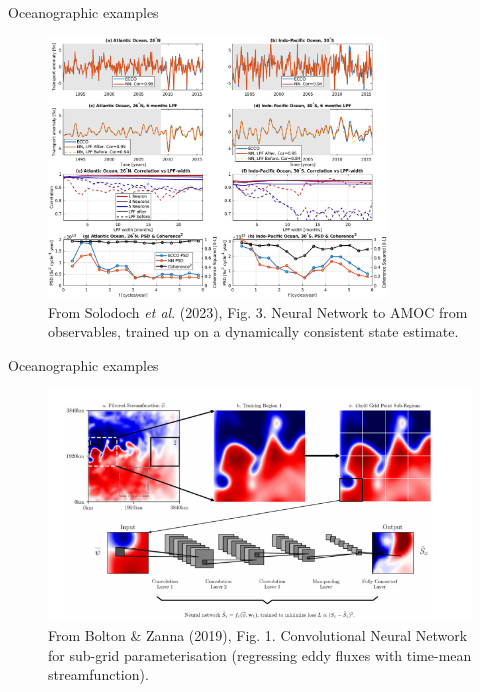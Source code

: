 \documentclass[xcolor=x11names,compress]{beamer}
\renewcommand{\(}{\begin{columns}}
\renewcommand{\)}{\end{columns}}
\newcommand{\<}[1]{\begin{column}{#1}}
\renewcommand{\>}{\end{column}}
\begin{document}

\begin{frame}{Oceanographic examples}

\begin{figure}
  \includegraphics[width=0.8\textwidth]{Solodoch_et_al_2023_fig3}
  \caption{From Solodoch \emph{et al}. (2023), Fig. 3. Neural Network to AMOC
  from observables, trained up on a dynamically consistent state estimate.}
\end{figure}

\end{frame}


\begin{frame}{Oceanographic examples}

\begin{figure}
  \includegraphics[width=\textwidth]{Bolton_Zanna_2019_schematic}
  \caption{From Bolton \& Zanna (2019), Fig. 1. Convolutional Neural
  Network for sub-grid parameterisation (regressing eddy fluxes with time-mean
  streamfunction).}
\end{figure}

\end{frame}
\end{document}
